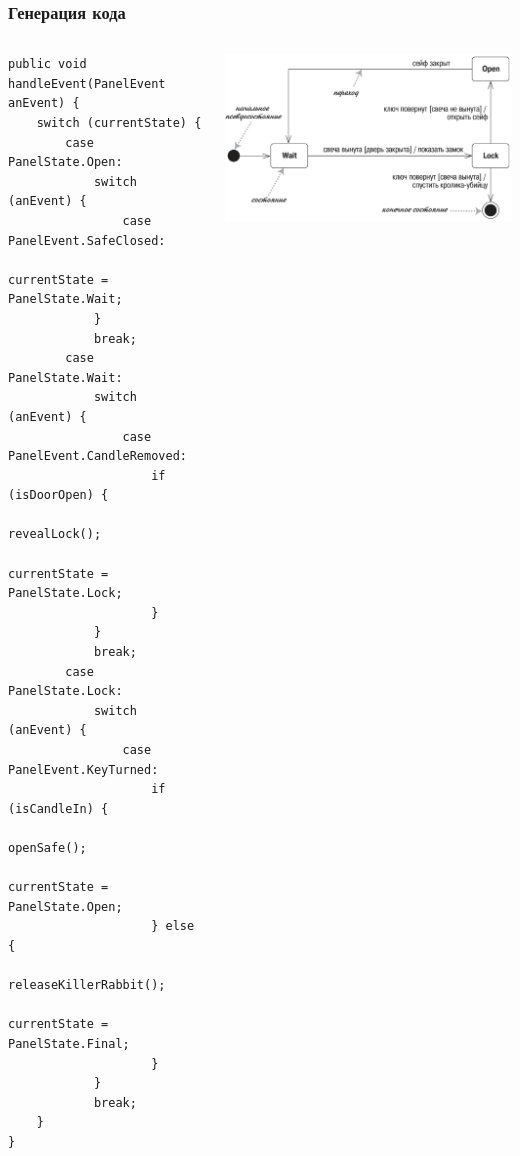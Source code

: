 \documentclass{../../slides-style}
\begin{document}
    \begin{frame}[fragile]
        \frametitle{Генерация кода}
        \begin{columns}
            \begin{column}{0.5\textwidth}
                \begin{tiny}
                    \begin{verbatim}
public void handleEvent(PanelEvent anEvent) {
    switch (currentState) {
        case PanelState.Open:
            switch (anEvent) {
                case PanelEvent.SafeClosed:
                    currentState = PanelState.Wait;
            }
            break;
        case PanelState.Wait:
            switch (anEvent) {
                case PanelEvent.CandleRemoved:
                    if (isDoorOpen) {
                        revealLock();
                        currentState = PanelState.Lock;
                    }
            }
            break;
        case PanelState.Lock:
            switch (anEvent) {
                case PanelEvent.KeyTurned:
                    if (isCandleIn) {
                        openSafe();
                        currentState = PanelState.Open;
                    } else {
                        releaseKillerRabbit();
                        currentState = PanelState.Final;
                    }
            }
            break;
    }
}
                    \end{verbatim}
                \end{tiny}
            \end{column}
            \begin{column}{0.5\textwidth}
                \begin{center}
                    \includegraphics[width=\textwidth]{stateTransitionSyntax.png}
                \end{center}
            \end{column}
        \end{columns}
    \end{frame}
\end{document}
